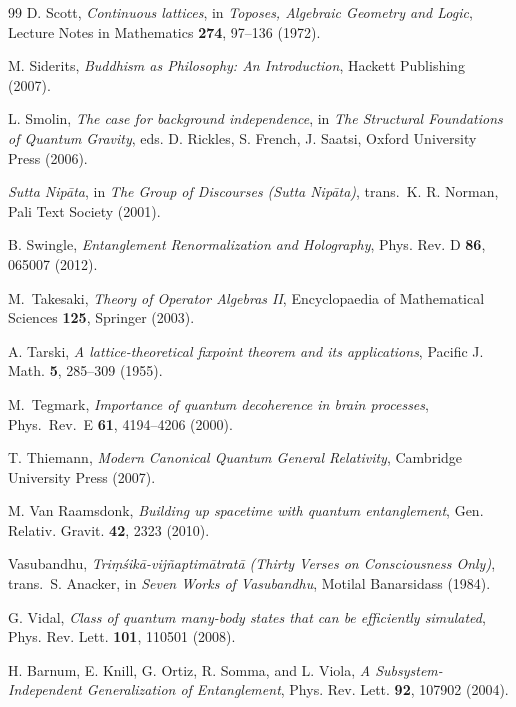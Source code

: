\documentclass[12pt,a4paper,openany]{book}
\begin{document}
\begin{thebibliography}{99}
D. Scott, \emph{Continuous lattices}, in \emph{Toposes, Algebraic Geometry and Logic}, Lecture Notes in Mathematics \textbf{274}, 97--136 (1972).

M. Siderits, \emph{Buddhism as Philosophy: An Introduction}, Hackett Publishing (2007).


L. Smolin, \emph{The case for background independence}, in \emph{The Structural Foundations of Quantum Gravity}, eds. D. Rickles, S. French, J. Saatsi, Oxford University Press (2006).

\emph{Sutta Nipāta}, in \emph{The Group of Discourses (Sutta Nipāta)}, trans.\ K. R. Norman, Pali Text Society (2001).

B. Swingle, \emph{Entanglement Renormalization and Holography}, Phys. Rev. D \textbf{86}, 065007 (2012).

M.~Takesaki,
\emph{Theory of Operator Algebras II},
Encyclopaedia of Mathematical Sciences \textbf{125}, Springer (2003).

A. Tarski, \emph{A lattice-theoretical fixpoint theorem and its applications}, Pacific J. Math. \textbf{5}, 285--309 (1955).

M.~Tegmark,
\emph{Importance of quantum decoherence in brain processes},
Phys.\ Rev.\ E \textbf{61}, 4194--4206 (2000).


T. Thiemann, \emph{Modern Canonical Quantum General Relativity}, Cambridge University Press (2007).

M. Van Raamsdonk, \emph{Building up spacetime with quantum entanglement}, Gen. Relativ. Gravit. \textbf{42}, 2323 (2010).

Vasubandhu, \emph{Triṃśikā-vijñaptimātratā (Thirty Verses on Consciousness Only)}, trans.\ S. Anacker, in \emph{Seven Works of Vasubandhu}, Motilal Banarsidass (1984).


G. Vidal, \emph{Class of quantum many-body states that can be efficiently simulated}, Phys. Rev. Lett. \textbf{101}, 110501 (2008).

H. Barnum, E. Knill, G. Ortiz, R. Somma, and L. Viola, \emph{A Subsystem-Independent Generalization of Entanglement}, Phys. Rev. Lett. \textbf{92}, 107902 (2004).


\end{thebibliography}
\end{document}
